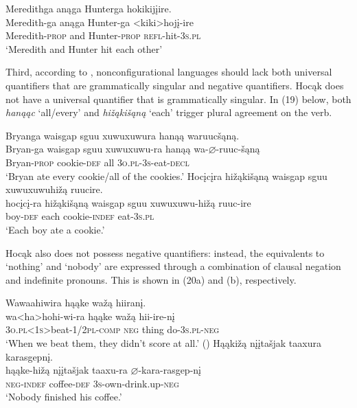 \documentclass[output=paper]{LSP/langsci}
\begin{document}
\begin{exe}
\ex 
\glll Meredithga		anąga 	Hunterga 			hokikij\k{i}ire.\\
Meredith-ga	 	anąga 	Hunter-ga 			<kiki>hoj\k{i}-ire \\
Meredith-\textsc{prop} and 		Hunter-\textsc{prop} 	\textsc{refl}-hit-\textsc{3s.pl} \\
\trans `Meredith and Hunter hit each other'
\end{exe}
	
Third, according to \citet{Baker1996}, nonconfigurational languages should lack both universal quantifiers that are grammatically singular and negative quantifiers. Hocąk does not have a universal quantifier that is grammatically singular.  In (19) below, both \textit{hanąąc} `all/every' and \textit{hi\v{z}ąki\v{s}ąną} `each' trigger plural agreement on the verb.

\begin{exe}
\ex	
\begin{xlist}
\ex	
\glll Bryanga {waisgap sguu xuwuxuwura} 	hanąą 	waruuc\v{s}ąną.\\
Bryan-ga 	{waisgap sguu xuwuxuwu-ra} 	hanąą 	wa-$\varnothing$-ruuc-\v{s}ąną \\
	Bryan-\textsc{prop} 	cookie-\textsc{def}	all 		\textsc{3o.pl-3s}-eat-\textsc{decl} \\
\trans `Bryan ate every cookie/all of the cookies.'
\ex 
\glll Hoc\k{i}c\k{i}ra 	hi\v{z}ąki\v{s}ąną 	{waisgap sguu xuwuxuwuhi\v{z}ą }		ruucire.\\
hoc\k{i}c\k{i}-ra 	hi\v{z}ąki\v{s}ąną 	{waisgap sguu xuwuxuwu-hi\v{z}ą }		ruuc-ire \\
	boy-\textsc{def} 		each 					cookie-\textsc{indef}		eat-\textsc{3s.pl}\\
\trans `Each boy ate a cookie.'
\end{xlist}
\end{exe}

Hocąk also does not possess negative quantifiers: instead, the equivalents to `nothing' and `nobody' are expressed through a combination of clausal negation and indefinite pronouns. This is shown in (20a) and (b), respectively.

\begin{exe}
\ex
\begin{xlist}
\ex	
\glll Wawaahiwira 	hąąke 	wa\v{z}ą 	hiiran\k{i}. \\
wa<ha>hohi-wi-ra 						hąąke 	wa\v{z}ą 	hii-ire-n\k{i} \\
	\textsc{3o.pl<1s>}beat-\textsc{1/2pl}-\textsc{comp} \textsc{neg}		thing 	do-\textsc{3s.pl-neg} \\
\trans `When we beat them, they didn't score at all.' (\citealt{Hartmann2012})
\ex	
\glll Hąąki\v{z}ą 	{n\k{i}\k{i}ta\v{s}jak taaxura} 	karasgepn\k{i}. \\
hąąke-hi\v{z}ą  {n\k{i}\k{i}ta\v{s}jak taaxu-ra }	$\varnothing$-kara-rasgep-n\k{i} \\
	\textsc{neg-indef} 	coffee-\textsc{def}	\textsc{3s}-own-drink.up-\textsc{neg} \\
\trans `Nobody finished his coffee.'
\end{xlist}
\end{exe}
	
\end{document}
